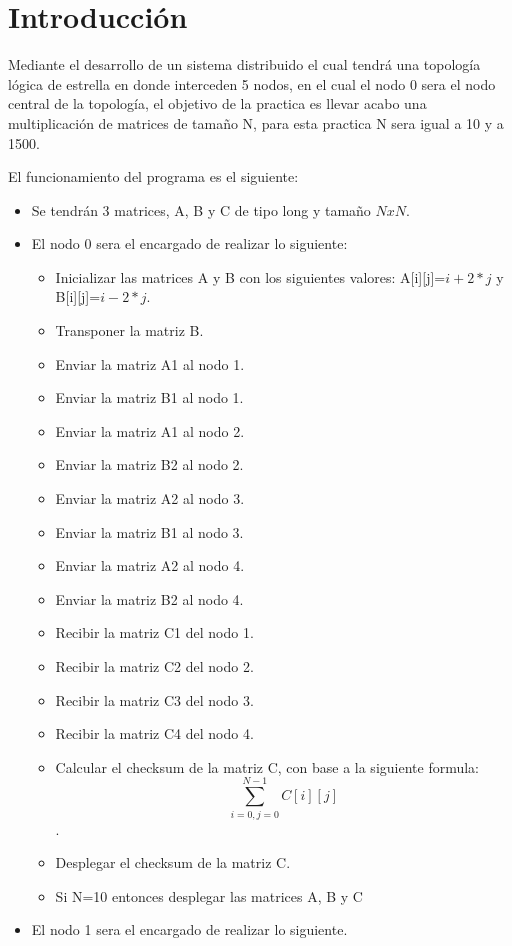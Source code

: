 \documentclass[11pt]{article}
\begin{document}
	\section{Introducción}
		Mediante el desarrollo de un sistema distribuido el cual tendrá una topología lógica de estrella en donde interceden 5 nodos, en el cual el nodo 0 sera el nodo central de la topología, el objetivo de la practica es llevar acabo una multiplicación de matrices de tamaño N, para esta practica N sera igual a 10 y a 1500.\par
		El funcionamiento del programa es el siguiente:
		\begin{itemize}
			\item Se tendrán 3 matrices, A, B y C de tipo long y tamaño $NxN$.
			\item El nodo 0 sera el encargado de realizar lo siguiente: 
				\begin{itemize}
					\item Inicializar las matrices A y B con los siguientes valores: A[i][j]=$i+2*j$ y B[i][j]=$i-2*j$.
					\item Transponer la matriz B.
					\item Enviar la matriz A1 al nodo 1.
					\item Enviar la matriz B1 al nodo 1.
					\item Enviar la matriz A1 al nodo 2.
					\item Enviar la matriz B2 al nodo 2.
					\item Enviar la matriz A2 al nodo 3.
					\item Enviar la matriz B1 al nodo 3.
					\item Enviar la matriz A2 al nodo 4.
					\item Enviar la matriz B2 al nodo 4.
					\item Recibir la matriz C1 del nodo 1.
					\item Recibir la matriz C2 del nodo 2.
					\item Recibir la matriz C3 del nodo 3.
					\item Recibir la matriz C4 del nodo 4.
					\item Calcular el checksum de la matriz C, con base a la siguiente formula: \[ \sum_{i=0,j=0}^{N-1}C[i][j] 
\].
					\item Desplegar el checksum de la matriz C.
					\item Si N=10 entonces desplegar las matrices A, B y C
				\end{itemize}				
			\item El nodo 1 sera el encargado de realizar lo siguiente.

\end{itemize}
\end{document}
